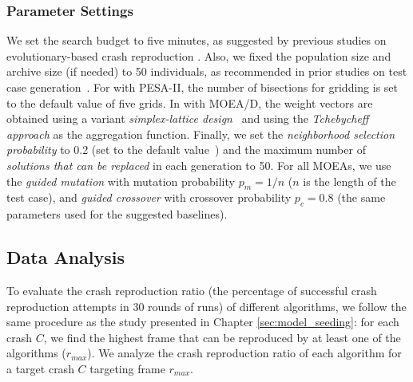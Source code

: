 \subsubsection{Parameter Settings}
We set the search budget to five minutes, as suggested by previous studies on evolutionary-based crash reproduction \cite{Soltani2018a}. Also, we fixed the population size and archive size (if needed) to 50 individuals, as recommended in prior studies on test case generation~\cite{Panichella2018}. For \moho with PESA-II, the number of bisections for gridding is set to the default value of five grids.
In \moho with MOEA/D, the weight vectors are obtained using a variant \textit{simplex-lattice design}~\cite{tan2012modification} and using the \textit{Tchebycheff approach} as the aggregation function. Finally, we set the \textit{neighborhood selection probability} to 0.2 (set to the default value~\cite{durillo2010jmetal}) and the maximum number of \textit{solutions that can be replaced} in each generation to 50. For all MOEAs, we use the 
\textit{guided mutation} with mutation probability $p_m=1/n$ ($n$ is the length of the test case), and  
\textit{guided crossover} with crossover probability $p_c=0.8$ (the same parameters used for the suggested baselines). 

\subsection{Data Analysis}

To evaluate the crash reproduction ratio (\ie the percentage of successful crash reproduction attempts in 30 rounds of runs) of different algorithms, we follow the same procedure as the study presented in Chapter \ref{sec:model_seeding}: for each crash $C$, we find the highest frame that can be reproduced by at least one of the algorithms ($r_{max}$). 
We analyze the crash reproduction ratio of each algorithm for a target crash $C$ targeting frame $r_{max}$.

